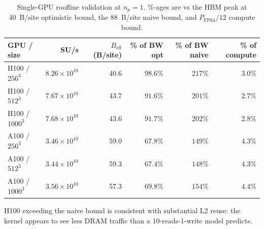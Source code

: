 \documentclass[10pt,a4paper]{article}
\begin{document}
\begin{table}[h]
\centering\small
\caption{Single-GPU roofline validation at $n_p{=}1$. \%-ages are vs the HBM peak at 40~B/site optimistic bound, the 88~B/site naive bound, and $P_{\text{FP64}}/12$ compute bound.}
\label{tab:roof}
\begin{tabular}{@{}lrrrrr@{}}
\toprule
GPU / size & SU/s & $B_{\text{eff}}$ (B/site) & \% of BW opt & \% of BW naive & \% of compute \\
\midrule
H100 / $256^3$  & $8.26\!\times\!10^{10}$ & 40.6 & $\mathbf{98.6\%}$ & $217\%$ & $3.0\%$ \\
H100 / $512^3$  & $7.67\!\times\!10^{10}$ & 43.7 & $91.6\%$          & $201\%$ & $2.7\%$ \\
H100 / $1000^3$ & $7.68\!\times\!10^{10}$ & 43.6 & $91.7\%$          & $202\%$ & $2.8\%$ \\
A100 / $256^3$  & $3.46\!\times\!10^{10}$ & 59.0 & $67.8\%$          & $149\%$ & $4.3\%$ \\
A100 / $512^3$  & $3.44\!\times\!10^{10}$ & 59.3 & $67.4\%$          & $148\%$ & $4.3\%$ \\
A100 / $1000^3$ & $3.56\!\times\!10^{10}$ & 57.3 & $69.8\%$          & $154\%$ & $4.4\%$ \\
\bottomrule
\end{tabular}
\end{table}

H100 exceeding the naive bound is consistent with substantial L2 reuse: the kernel appears to see less DRAM traffic than a 10-reads-1-write model predicts.
\end{document}
